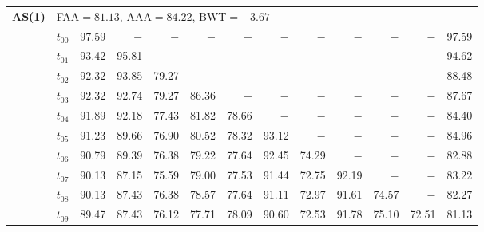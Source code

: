 \begin{table}[ht]
\begin{tabular}{@{}l l r r r r r r r r r r r@{}}
\midrule
\multirow{11}{*}{\textbf{AS(1)}} & \multicolumn{12}{l}{\quad\small FAA$=81.13$,\; AAA$=84.22$,\; BWT$=-3.67$} \\
 & $t_{00}$ & 97.59 & $-$ & $-$ & $-$ & $-$ & $-$ & $-$ & $-$ & $-$ & $-$ & 97.59 \\
 & $t_{01}$ & 93.42 & 95.81 & $-$ & $-$ & $-$ & $-$ & $-$ & $-$ & $-$ & $-$ & 94.62 \\
 & $t_{02}$ & 92.32 & 93.85 & 79.27 & $-$ & $-$ & $-$ & $-$ & $-$ & $-$ & $-$ & 88.48 \\
 & $t_{03}$ & 92.32 & 92.74 & 79.27 & 86.36 & $-$ & $-$ & $-$ & $-$ & $-$ & $-$ & 87.67 \\
 & $t_{04}$ & 91.89 & 92.18 & 77.43 & 81.82 & 78.66 & $-$ & $-$ & $-$ & $-$ & $-$ & 84.40 \\
 & $t_{05}$ & 91.23 & 89.66 & 76.90 & 80.52 & 78.32 & 93.12 & $-$ & $-$ & $-$ & $-$ & 84.96 \\
 & $t_{06}$ & 90.79 & 89.39 & 76.38 & 79.22 & 77.64 & 92.45 & 74.29 & $-$ & $-$ & $-$ & 82.88 \\
 & $t_{07}$ & 90.13 & 87.15 & 75.59 & 79.00 & 77.53 & 91.44 & 72.75 & 92.19 & $-$ & $-$ & 83.22 \\
 & $t_{08}$ & 90.13 & 87.43 & 76.38 & 78.57 & 77.64 & 91.11 & 72.97 & 91.61 & 74.57 & $-$ & 82.27 \\
 & $t_{09}$ & 89.47 & 87.43 & 76.12 & 77.71 & 78.09 & 90.60 & 72.53 & 91.78 & 75.10 & 72.51 & 81.13 \\
\bottomrule
\end{tabular}
\end{table}

